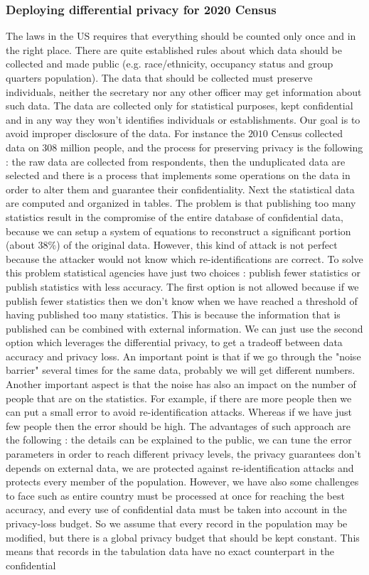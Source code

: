 \subsubsection{Deploying differential privacy for 2020 Census}
The laws in the US requires that everything should be counted only once and in the right place. There are quite established rules about which data should be collected and made public (e.g. race/ethnicity, occupancy status and group quarters population). The data that should be collected must preserve individuals, neither the secretary nor any other officer may get information about such data. The data are collected only for statistical purposes, kept confidential and in any way they won't identifies individuals or establishments. Our goal is to avoid improper disclosure of the data. For instance the $2010$ Census collected data on $308$ million people, and the process for preserving privacy is the following : the raw data are collected from respondents, then the unduplicated data are selected and there is a process that implements some operations on the data in order to alter them and guarantee their confidentiality. Next the statistical data are computed and organized in tables. The problem is that publishing too many statistics result in the compromise of the entire database of confidential data, because we can setup a system of equations to reconstruct a significant portion (about $38 \%$) of the original data. However, this kind of attack is not perfect because the attacker would not know which re-identifications are correct. To solve this problem statistical agencies have just two choices : publish fewer statistics or publish statistics with less accuracy. The first option is not allowed because if we publish fewer statistics then we don't know when we have reached a threshold of having published too many statistics. This is because the information that is published can be combined with external information. We can just use the second option which leverages the differential privacy, to get a tradeoff between data accuracy and privacy loss. An important point is that if we go through the "noise barrier" several times for the same data, probably we will get different numbers. Another important aspect is that the noise has also an impact on the number of people that are on the statistics. For example, if there are more people then we can put a small error to avoid re-identification attacks. Whereas if we have just few people then the error should be high. The advantages of such approach are the following : the details can be explained to the public, we can tune the error parameters in order to reach different privacy levels, the privacy guarantees don't depends on external data, we are protected against re-identification attacks and protects every member of the population. However, we have also some challenges to face such as entire country must be processed at once for reaching the best accuracy, and every use of confidential data must be taken into account in the privacy-loss budget. So we assume that every record in the population may be modified, but there is a global privacy budget that should be kept constant. This means that records in the tabulation data have no exact counterpart in the confidential 